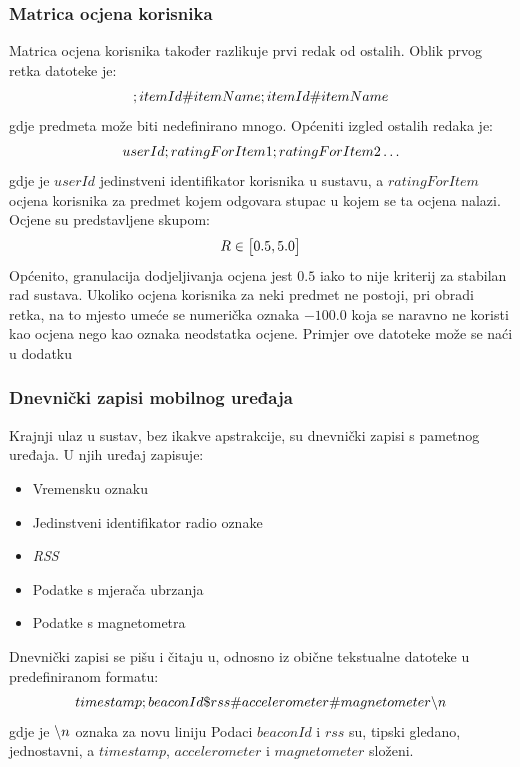 \documentclass[times, utf8, diplomski, numeric]{fer}
\begin{document}
\subsubsection{Matrica ocjena korisnika}
Matrica ocjena korisnika također razlikuje prvi redak od ostalih. 
Oblik prvog retka datoteke je:
\begin{equation}
	\centering
	;itemId\#itemName;itemId\#itemName
\end{equation}
gdje predmeta može biti nedefinirano mnogo. Općeniti izgled ostalih redaka je:
\begin{equation}
	\centering
	userId;ratingForItem1;ratingForItem2 \ldots
\end{equation}
gdje je $userId$ jedinstveni identifikator korisnika u sustavu, a
$ratingForItem$ ocjena korisnika za predmet kojem odgovara stupac u kojem se ta
ocjena nalazi. Ocjene su predstavljene skupom:
\begin{equation}
	\centering
	R \in \big[ 0.5, 5.0 \big]
\end{equation}
Općenito, granulacija dodjeljivanja ocjena jest $0.5$ iako to nije kriterij za
stabilan rad sustava. Ukoliko ocjena korisnika za neki predmet ne postoji, pri
obradi retka, na to mjesto umeće se numerička oznaka $-100.0$ koja se naravno
ne koristi kao ocjena nego kao oznaka neodstatka ocjene. Primjer ove datoteke
može se naći u dodatku

\subsubsection{Dnevnički zapisi mobilnog uređaja}

Krajnji ulaz u sustav, bez ikakve apstrakcije, su dnevnički zapisi  s
pametnog uređaja. U njih uređaj zapisuje:
\begin{itemize}
  \item Vremensku oznaku
  \item Jedinstveni identifikator radio oznake
  \item \emph{RSS} 
  \item Podatke s mjerača ubrzanja 
  \item Podatke s magnetometra 
\end{itemize}
Dnevnički zapisi se pišu i čitaju u, odnosno iz obične tekstualne datoteke u
predefiniranom formatu:
\begin{equation}
	\centering
	timestamp;beaconId\$rss\#accelerometer\#magnetometer\char`\\n
\end{equation}
gdje je $\char`\\n$ oznaka za novu liniju 
Podaci $beaconId$ i $rss$ su, tipski gledano, jednostavni, a $timestamp$,
$accelerometer$ i $magnetometer$ složeni.
\end{document}
